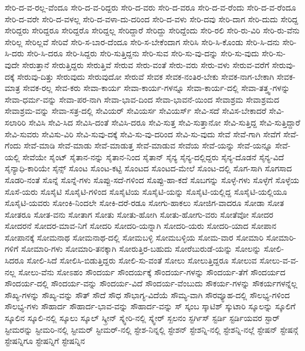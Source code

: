 {ಸೇರಿ-ದ-ವ-ರಲ್ಲ-ವೆಂದೂ
ಸೇರಿ-ದ-ವ-ರಿದ್ದರು
ಸೇರಿ-ದ-ವರು
ಸೇರಿ-ದ-ವರೂ
ಸೇರಿ-ದ-ವ-ರೆಂದು
ಸೇರಿ-ದ-ವ-ರೆಂದೂ
ಸೇರಿ-ದ-ವರೇ
ಸೇರಿ-ದ-ವಳಲ್ಲ
ಸೇರಿ-ದ-ವಳಾ-ದು-ದರಿಂದ
ಸೇರಿ-ದ-ವಳು
ಸೇರಿ-ದವು
ಸೇರಿ-ದಾಗ
ಸೇರಿ-ದುದು
ಸೇರಿದ್ದ
ಸೇರಿದ್ದರು
ಸೇರಿದ್ದರೂ
ಸೇರಿದ್ದರೊ
ಸೇರಿದ್ದಲ್ಲ
ಸೇರಿದ್ದಾರೆ
ಸೇರಿದ್ದು
ಸೇರಿದ್ದೆಂದು
ಸೇರಿ-ರಲಿ
ಸೇರಿ-ರು-ವಿರಿ
ಸೇರಿ-ರು-ವೆನು
ಸೇರಿಲ್ಲ
ಸೇರಿಲ್ಲವೆ
ಸೇರಿವೆ
ಸೇರಿ-ಸ-ಬಾರ-ದೆಂದೂ
ಸೇರಿ-ಸ-ಬೇಕೆಂದಾಗ
ಸೇರಿಸಿ
ಸೇರಿ-ಸಿ-ಕೊಂಡು
ಸೇರಿ-ಸಿ-ದನು
ಸೇರಿ-ಸಿ-ದರು
ಸೇರಿ-ಸಿ-ದರೂ
ಸೇರಿ-ಸಿದ್ದರು
ಸೇರಿ-ಸುತ್ತಿದ್ದನು
ಸೇರಿ-ಸುವ
ಸೇರಿ-ಸು-ವು-ದನ್ನು
ಸೇರಿ-ಸು-ವುದು
ಸೇರಿ-ಸು-ವುದೇ
ಸೇರುತ್ತಾನೆ
ಸೇರುತ್ತಿದ್ದರು
ಸೇರುತ್ತಿವೆ
ಸೇರುವ
ಸೇರು-ವಂತೆ
ಸೇರು-ವರು
ಸೇರು-ವಳು
ಸೇರುವ-ವರೆಗೆ
ಸೇರುವು-ದಕ್ಕೆ
ಸೇರುವು-ದಿತ್ತು
ಸೇರುವುದು
ಸೇರುವುದೋ
ಸೇರುವೆ
ಸೇವಕ
ಸೇವಕ-ನಂತಿರ-ಬೇಕು
ಸೇವಕ-ನಾಗ-ಬೇಕಾಗಿ
ಸೇವಕ-ಮಾತ್ರ
ಸೇವಕ-ರಲ್ಲ
ಸೇವ-ಕರು
ಸೇವಾ-ಕಾರ್ಯ
ಸೇವಾ-ಕಾರ್ಯ-ಗಳನ್ನೂ
ಸೇವಾ-ಕಾರ್ಯ-ದಲ್ಲಿ
ಸೇವಾ-ತತ್ತ್ವ-ಗಳನ್ನು
ಸೇವಾ-ಧರ್ಮ-ವನ್ನು
ಸೇವಾ-ಪರ-ನಾಗಿ
ಸೇವಾ-ಭಾವ-ದಿಂದ
ಸೇವಾ-ಭಾವನೆ-ಯಿಂದ
ಸೇವಾಶ್ರಮ
ಸೇವಾಶ್ರಮದ
ಸೇವಾಶ್ರಮ-ವನ್ನು
ಸೇವಾ-ಸತ್ರ-ದಲ್ಲಿ
ಸೇವಿಯರ್
ಸೇವಿಯರ್ಸ
ಸೇವಿಯರ್ಸ್
ಸೇವಿ-ಸದೆ
ಸೇವಿಸ-ಬೇಕಾದರೆ
ಸೇವಿ-ಸಲಾರಿರಿ
ಸೇವಿಸಿ
ಸೇವಿ-ಸಿದ
ಸೇವಿಸಿ-ದಂತೆ
ಸೇವಿಸಿ-ದರೂ
ಸೇವಿ-ಸುತ್ತ
ಸೇವಿ-ಸುತ್ತಾನೋ
ಸೇವಿ-ಸುತ್ತಿದ್ದ
ಸೇವಿ-ಸುತ್ತಿದ್ದಾರೆ
ಸೇವಿ-ಸುವರು
ಸೇವಿಸು-ವಿರಿ
ಸೇವಿ-ಸುವು-ದಕ್ಕೆ
ಸೇವಿ-ಸು-ವು-ದರಿಂದ
ಸೇವಿ-ಸು-ವುದು
ಸೇವೆ
ಸೇವೆ-ಗಾಗಿ
ಸೇವೆಗೆ
ಸೇವೆ-ಗೆಂದು
ಸೇವೆ-ಮಾಡಿ
ಸೇವೆ-ಮಾಡು
ಸೇವೆ-ಮಾಡುತ್ತ
ಸೇವೆ-ಮಾಡುವ
ಸೇವೆಯ
ಸೇವೆ-ಯನ್ನು
ಸೇವೆ-ಯನ್ನೂ
ಸೇವೆ-ಯಲ್ಲಿ
ಸೇವೆಯೇ
ಸೈಂಟ್
ಸೈತಾನ-ನನ್ನು
ಸೈತಾನ-ನಿಂದ
ಸೈತಾನ್
ಸೈನ್ಯ
ಸೈನ್ಯ-ದಲ್ಲಿದ್ದರು
ಸೈನ್ಯ-ದೊಡನೆ
ಸೈನ್ಯ-ವಿದೆ
ಸೈನ್ಯಾಧಿ-ಕಾರಿಯೇ
ಸೈನ್ಸ್
ಸೊಂಟ
ಸೊಂಟ-ಕಟ್ಟಿ
ಸೊಂಟದ
ಸೊಂಟದ-ಮೇಲೆ
ಸೊಂಟ-ದಲ್ಲಿ
ಸೊಗ-ಸಾಗಿ
ಸೊಗಸಾದ
ಸೊಡರಿ-ನಂತೆ
ಸೊನ್ನೆ
ಸೊನ್ನೆ-ಗಳು
ಸೊಪ್ಪು-ಸದೆ-ಗಳಿಂದ
ಸೊಪ್ಪು-ಹಾ-ಕದೆ
ಸೊಬಗನ್ನು
ಸೊಳ್ಳೆ-ಗಳು
ಸೊಳ್ಳೆಗೆ
ಸೊಳ್ಳೆಯ
ಸೊಸೆ-ಯರು
ಸೊಸೈಟಿ
ಸೊಸೈಟಿ-ಗಳಿಂದ
ಸೊಸೈಟಿಯ
ಸೊಸೈಟಿ-ಯನ್ನು
ಸೊಸೈಟಿ-ಯಲ್ಲಿದ್ದ
ಸೊಸೈಟಿ-ಯಲ್ಲಿಯೂ
ಸೊಸೈಟಿ-ಯವರು
ಸೋಂಕಿ-ನಿಂದಲೇ
ಸೋಕಿ-ದರೆ-ರಡೂ
ಸೋಗು-ಹಾಕಲು
ಸೋಜಿಗ-ವಾದರೂ
ಸೋಡಾ
ಸೋತ
ಸೋತರೂ
ಸೋತ-ವನು
ಸೋತಾಗ
ಸೋತು
ಸೋತು-ಹೋಗಿ
ಸೋತು-ಹೋಗು-ವರು
ಸೋತೆವೋ
ಸೋದರ
ಸೋದರನೆ
ಸೋದರ-ಮಾವ-ನಿಗೆ
ಸೋದರಿ
ಸೋದರಿ-ಯನ್ನಾಗಿ
ಸೋದರಿ-ಯರು
ಸೋದರಿ-ಯಾದ
ಸೋಪಾನ
ಸೋಪಾನಕ್ಕೆ
ಸೋಮನಾಥ
ಸೋಮನಾಥ-ದಲ್ಲಿ
ಸೋಮಬಳ್ಳಿ
ಸೋಮಬಳ್ಳಿಯ
ಸೋಮ-ವಾರ
ಸೋಮಾರಿ
ಸೋಮಾರಿ-ಗಳಿಗೆ
ಸೋಮಾರಿ-ಗಳು
ಸೋಮಾರಿ-ತನಕ್ಕಾಗಿ
ಸೋರುತ್ತಿರ-ಬಹುದು
ಸೋರೆಬುರುಡೆ-ಯನ್ನು
ಸೋಲನ್ನು
ಸೋಲಿ-ಸಿದರೂ
ಸೋಲಿ-ಸಿದೆ
ಸೋಲಿಸಿ-ಬಿಡುತ್ತಿದ್ದರು
ಸೋಲಿ-ಸು-ವಂತೆ
ಸೋಲು
ಸೋಲುತ್ತಿದ್ದರೂ
ಸೋಲುವ
ಸೋಲು-ವ-ವ-ನಲ್ಲ
ಸೋಲು-ವೆನು
ಸೋಽಹಂ
ಸೌಂದರ್ಯ
ಸೌಂದರ್ಯಕ್ಕೆ
ಸೌಂದರ್ಯ-ಗಳನ್ನು
ಸೌಂದರ್ಯ-ತೆಗೆ
ಸೌಂದರ್ಯದ
ಸೌಂದರ್ಯ-ದಲ್ಲಿ
ಸೌಂದರ್ಯ-ವನ್ನು
ಸೌಂದರ್ಯ-ವಿದೆ
ಸೌಂದರ್ಯ-ವೆಂಬುದು
ಸೌಕರ್ಯ-ಗಳನ್ನು
ಸೌಕರ್ಯಗಳನ್ನೆಲ್ಲ
ಸೌಖ್ಯ-ಗಳನ್ನು
ಸೌಖ್ಯ-ವನ್ನು
ಸೌತ್
ಸೌದೆ
ಸೌಧ
ಸೌಭಾಗ್ಯ-ವಿದೆಯೆ
ಸೌಮ್ಯ-ವಾಗಿ
ಸೌರವ್ಯೂಹ-ದಲ್ಲಿ
ಸೌಲಭ್ಯ-ಗಳಿಂದ
ಸೌಲಭ್ಯ-ಗಳು
ಸೌಹಾರ್ದ
ಸೌಹಾರ್ದ-ಭಾವ-ವನ್ನು
ಸೌಹಾರ್ದ-ವನ್ನು
ಸ್
ಸ್ಕಂಬ
ಸ್ಕಾಟಿಶ್
ಸ್ಕುಟಾರಿ
ಸ್ಕೂಲನ್ನು
ಸ್ಕೂಲಿಗೆ
ಸ್ಕೂಲಿನ
ಸ್ಕೂಲಿ-ನಲ್ಲಿ
ಸ್ಕೂಲು
ಸ್ಕೂಲ್
ಸ್ಕ್ರೀನ್
ಸ್ಕ್ವೇರಿ-ನಲ್ಲಿ
ಸ್ಕ್ವೇರ್
ಸ್ಖಲನಂ
ಸ್ಟರ್ಗಿಸ್
ಸ್ಟರ್ಡಿ
ಸ್ಟರ್ಡಿಯವರ
ಸ್ಟಾರ್
ಸ್ಟೀಮರನ್ನು
ಸ್ಟೀಮರಿ-ನಲ್ಲಿ
ಸ್ಟೀಮರ್
ಸ್ಟೀಮರ್-ನಲ್ಲಿ
ಸ್ಟೇಶ-ನಿನ್ನಲ್ಲಿ
ಸ್ಟೇಶನ್
ಸ್ಟೇಶನ್ನಿ-ನಲ್ಲಿ
ಸ್ಟೇಶನ್ನಿ-ನಲ್ಲೆ
ಸ್ಟೇಷನ್
ಸ್ಟೇಷನ್ಗೆ
ಸ್ಟೇಷನ್ನಿಗೂ
ಸ್ಟೇಷನ್ನಿಗೆ
ಸ್ಟೇಷನ್ನಿನ
}
